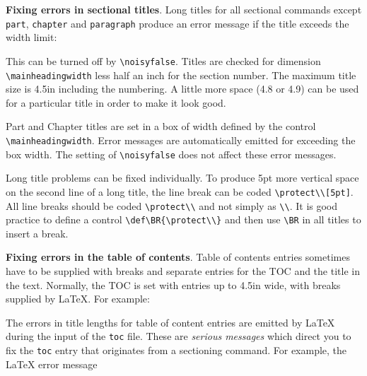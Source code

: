 \begin{description}
{\bf Fixing errors in sectional titles}.
Long titles for all sectional commands except {\tt part}, {\tt chapter}
and {\tt paragraph} produce an error message if the title exceeds the
width limit:


This can be
turned off by \verb"\noisyfalse". Titles are
checked for dimension \verb"\mainheadingwidth" less half an inch for the
section number. The maximum title size is 4.5in including the numbering.
A little more space (4.8 or 4.9) can be used for a particular title in
order to make it look good.

Part and Chapter titles are set in a box of width defined by the control
\verb"\mainheadingwidth". Error messages are automatically emitted for
exceeding the box width. The setting of \verb"\noisyfalse" does not
affect these error messages.

Long title problems can be fixed individually. To produce 5pt
more vertical space on the second line of a long title, the line break
can be coded \verb"\protect\\[5pt]". All line breaks should be coded
\verb"\protect\\" and not simply as \verb"\\". It is good practice to
define a control  \verb"\def\BR{\protect\\}" and then use \verb"\BR" in
all titles to insert a break.

{\bf Fixing errors in the table of contents}.
Table of contents entries sometimes have to be supplied with breaks and
separate entries for the TOC and the title in the text. Normally, the
TOC is set with entries up to 4.5in wide, with breaks supplied by
\LaTeX{}. For example:


The errors in title lengths for table of content entries are emitted by
\LaTeX{} during the input of the {\tt toc} file. These are {\em serious
messages} which direct you to fix the {\tt toc} entry that originates
from a sectioning command. For example, the \LaTeX{} error message


\end{description}
